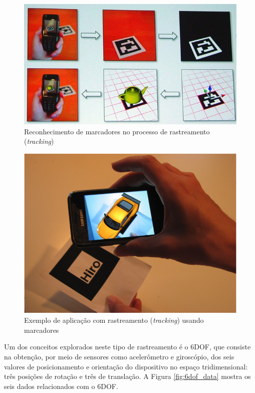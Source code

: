 \begin{figure}[h!]
    \centering
    \caption{Reconhecimento de marcadores no processo de rastreamento (\textit{tracking})}
    \label{fig:AR-marker}
    \includegraphics[width=15cm]{resources/marker-tracking.jpg}
\end{figure}



\begin{figure}[h!]
    \centering
    \caption{Exemplo de aplicação com rastreamento (\textit{tracking}) usando marcadores}
    \label{fig:AR-marker-example1}
    \includegraphics[width=15cm]{resources/marker-tracking-example1.png}
\end{figure}



\label{def:6dof}
Um dos conceitos explorados neste tipo de rastreamento é o \gls{6DOF},
que consiste na obtenção, por meio de sensores como acelerômetro e giroscópio, 
dos seis valores de posicionamento e orientação do dispositivo no espaço
tridimensional: três posições de rotação e três de translação. A Figura 
\ref{fig:6dof_data} mostra os seis dados relacionados com o \gls{6DOF}.

